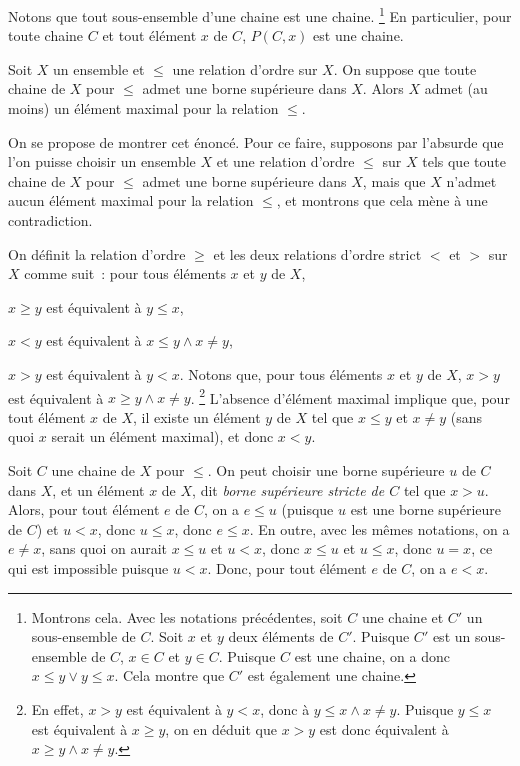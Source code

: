 Notons que tout sous-ensemble d'une chaine est une chaine.%
\footnote{Montrons cela. Avec les notations précédentes, soit $C$ une chaine et $C'$ un sous-ensemble de $C$.
    Soit $x$ et $y$ deux éléments de $C'$.
    Puisque $C'$ est un sous-ensemble de $C$, $x \in C$ et $y \in C$.
    Puisque $C$ est une chaine, on a donc $x \leq y \vee y \leq x$.
    Cela montre que $C'$ est également une chaine.}
En particulier, pour toute chaine $C$ et tout élément $x$ de $C$, $P(C, x)$ est une chaine.

\blank[medium]

\noindent{} Soit $X$ un ensemble et $\leq$ une relation d'ordre sur $X$.
    On suppose que toute chaine de $X$ pour $\leq$ admet une borne supérieure dans $X$.
    Alors $X$ admet (au moins) un élément maximal pour la relation $\leq$.

\blank[medium]

On se propose de montrer cet énoncé. 
Pour ce faire, supposons par l'absurde que l'on puisse choisir un ensemble $X$ et une relation d'ordre $\leq$ sur $X$ tels que toute chaine de $X$ pour $\leq$ admet une borne supérieure dans $X$, mais que $X$ n'admet aucun élément maximal pour la relation $\leq$, et montrons que cela mène à une contradiction. 

On définit la relation d'ordre $\geq$ et les deux relations d'ordre strict $<$ et $>$ sur $X$ comme suit : pour tous éléments $x$ et $y$ de $X$, 
\startitemize[nowhite]
    \item $x \geq y$ est équivalent à $y \leq x$,
    \item $x < y$ est équivalent à $x \leq y \wedge x \neq y$,
    \item $x > y$ est équivalent à $y < x$.
\stopitemize
Notons que, pour tous éléments $x$ et $y$ de $X$, $x > y$ est équivalent à $x \geq y \wedge x \neq y$.%
\footnote{
    En effet, $x > y$ est équivalent à $y < x$, donc à $y \leq x \wedge x \neq y$. 
    Puisque $y \leq x$ est équivalent à $x \geq y$, on en déduit que $x > y$ est donc équivalent à $x \geq y \wedge x \neq y$.
}
L'absence d'élément maximal implique que, pour tout élément $x$ de $X$, il existe un élément $y$ de $X$ tel que $x \leq y$ et $x \neq y$ (sans quoi $x$ serait un élément maximal), et donc $x < y$.

\blank[medium]

Soit $C$ une chaine de $X$ pour $\leq$. 
On peut choisir une borne supérieure $u$ de $C$ dans $X$, et un élément $x$ de $X$, dit \emph{borne supérieure stricte de $C$} tel que $x > u$. 
Alors, pour tout élément $e$ de $C$, on a $e \leq u$ (puisque $u$ est une borne supérieure de $C$) et $u < x$, donc $u \leq x$, donc $e \leq x$.
En outre, avec les mêmes notations, on a $e \neq x$, sans quoi on aurait $x \leq u$ et $u < x$, donc $x \leq u$ et $u \leq x$, donc $u = x$, ce qui est impossible puisque $u < x$. 
Donc, pour tout élément $e$ de $C$, on a $e < x$. 

